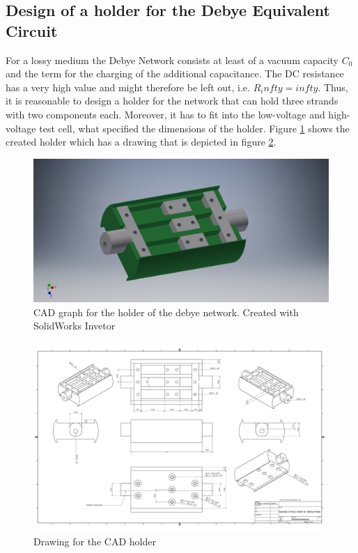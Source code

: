\subsection{Design of a holder for the Debye Equivalent Circuit}
For a lossy medium the Debye Network consists at least of a vacuum capacity $C_0$ and the term for the charging of the additional capacitance. The DC resistance has a very high value and might therefore be left out, i.e. $R_infty=infty$. Thus, it is reasonable to design a holder for the network that can hold three strands with two components each. Moreover, it has to fit into the low-voltage and high-voltage test cell, what specified the dimensions of the holder.  
Figure \ref{fig.CADgraph} shows the created holder which has a drawing that is depicted in figure \ref{fig.CADdrawing}.

\begin{figure}
\includegraphics[width=\textwidth]{figures/Method/CAD_MODEL/Gesamtanordnung.jpg}
\caption{CAD graph for the holder of the debye network. Created with SolidWorks Invetor}
\label{fig.CADgraph}
\end{figure}
\newpage

\begin{figure}
\includegraphics[width=0.99\textwidth]{figures/Gesamtanordnung.pdf}
    \caption{Drawing for the CAD holder}
    \label{fig.CADdrawing}
   \end{figure}	
\newpage
    


